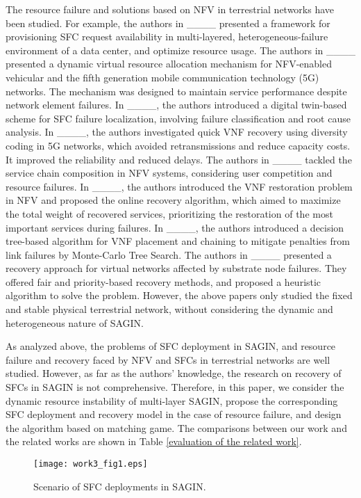 The resource failure and solutions based on NFV in terrestrial networks have been studied. For example, the authors in ____ presented a framework for provisioning SFC request availability in multi-layered, heterogeneous-failure environment of a data center, and optimize resource usage. The authors in ____ presented a dynamic virtual resource allocation mechanism for NFV-enabled vehicular and the fifth generation mobile communication technology (5G) networks. The mechanism was designed to maintain service performance despite network element failures. In ____, the authors introduced a digital twin-based scheme for SFC failure localization, involving failure classification and root cause analysis. In ____, the authors investigated quick VNF recovery using diversity coding in 5G networks, which avoided retransmissions and reduce capacity costs. It improved the reliability and reduced delays. The authors in ____ tackled the service chain composition in NFV systems, considering user competition and resource failures. In ____, the authors introduced the VNF restoration problem in NFV and proposed the online recovery algorithm, which aimed to maximize the total weight of recovered services, prioritizing the restoration of the most important services during failures. In ____, the authors introduced a decision tree-based algorithm for VNF placement and chaining to mitigate penalties from link failures by Monte-Carlo Tree Search. The authors in ____ presented a recovery approach for virtual networks affected by substrate node failures. They offered fair and priority-based recovery methods, and proposed a heuristic algorithm to solve the problem. However, the above papers only studied the fixed and stable physical terrestrial network, without considering the dynamic and heterogeneous nature of SAGIN.

As analyzed above, the problems of SFC deployment in SAGIN, and resource failure and recovery faced by NFV and SFCs in terrestrial networks are well studied. However, as far as the authors' knowledge, the research on recovery of SFCs in SAGIN is not comprehensive. Therefore, in this paper, we consider the dynamic resource instability of multi-layer SAGIN, propose the corresponding SFC deployment and recovery model in the case of resource failure, and design the algorithm based on matching game. The comparisons between our work and the related works are shown in Table \ref{evaluation of the related work}.

\begin{figure}[!t]
    \centerline{\texttt{[image: work3\_fig1.eps]}}
   \caption{Scenario of SFC deployments in SAGIN.}\label{fig1}
\end{figure}

%